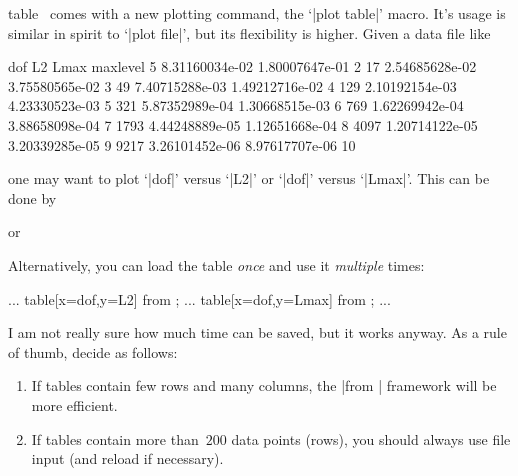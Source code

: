 \begin{addplotoperation}[]{table}{}
\PGFPlots\ comes with a new plotting command, the `|plot table|' macro. It's usage is similar in spirit to `|plot file|', but its flexibility is higher. Given a data file like
\begin{codeexample}
dof     L2              Lmax            maxlevel
5       8.31160034e-02  1.80007647e-01  2
17      2.54685628e-02  3.75580565e-02  3
49      7.40715288e-03  1.49212716e-02  4
129     2.10192154e-03  4.23330523e-03  5
321     5.87352989e-04  1.30668515e-03  6
769     1.62269942e-04  3.88658098e-04  7
1793    4.44248889e-05  1.12651668e-04  8
4097    1.20714122e-05  3.20339285e-05  9
9217    3.26101452e-06  8.97617707e-06  10
\end{codeexample}
one may want to plot `|dof|' versus `|L2|' or `|dof|' versus `|Lmax|'. This can be done by
\begin{codeexample}
\end{codeexample}
or
\begin{codeexample}
\end{codeexample}
Alternatively, you can load the table \emph{once} and use it \emph{multiple} times:
\begin{codeexample}
\table
...
\addplot table[x=dof,y=L2] from \table;
...
\addplot table[x=dof,y=Lmax] from \table;
...
\end{codeexample}
I am not really sure how much time can be saved, but it works anyway. As a rule of thumb, decide as follows:
\begin{enumerate}
	\item If tables contain few rows and many columns, the |from | framework will be more efficient.
	\item If tables contain more than~$200$ data points (rows), you should always use file input (and reload if necessary).
\end{enumerate}


\end{addplotoperation}
